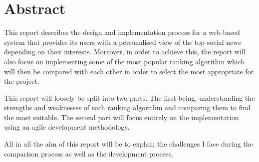 
\chapter*{Abstract}

This report describes the design and implementation process for a web-based system that provides its users with a personalised view of the top social news depending on their interests. Moreover, in order to achieve this, the report will also focus on implementing some of the most popular ranking algorithm which will then be compared with each other in order to select the most appropriate for the project.

This report will loosely be split into two parts. The first being, understanding the strengths and weaknesses of each ranking algorithm and comparing them to find the most suitable. The second part will focus entirely on the implementation using an agile development methodology.

All in all the aim of this report will be to explain the challenges I face during the comparison process as well as the development process.
